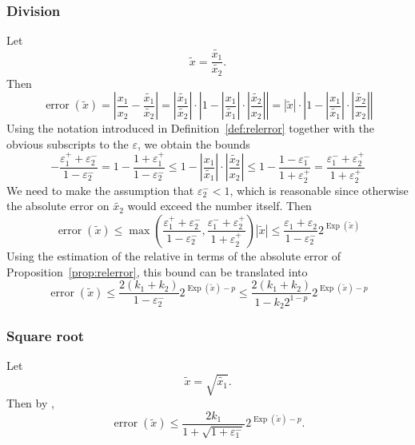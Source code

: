 \documentclass [11pt]{article}
\newcommand {\corr}[1]{{#1}}
\newcommand {\appro}[1]{\widetilde {#1}}
\DeclareMathOperator{\Exp}{\operatorname {Exp}}
\newcommand{\error}{\operatorname {error}}
\renewcommand {\epsilon}{\varepsilon}
\renewcommand {\leq}{\leqslant}
\begin{document}
\subsubsection {Division}
\label {sssec:proprealdiv}

Let
\[
\appro x = \frac {\appro {x_1}}{\appro {x_2}}.
\]
Then
\[
\error (\appro x) = \left|
\frac {\corr {x_1}}{\corr {x_2}} - \frac {\appro {x_1}}{\appro {x_2}} \right|
= \left| \frac {\appro {x_1}}{\appro {x_2}} \right|
\cdot \left|
1 - \left| \frac {\corr {x_1}}{\appro {x_1}} \right|
   \cdot \left| \frac {\appro {x_2}}{\corr {x_2}} \right|
\right|
= | \appro x |
\cdot \left|
1 - \left| \frac {\corr {x_1}}{\appro {x_1}} \right|
   \cdot \left| \frac {\appro {x_2}}{\corr {x_2}} \right|
\right|
\]
Using the notation introduced in Definition~\ref {def:relerror} together
with the obvious subscripts to the $\epsilon$, we obtain the bounds
\[
- \frac {\epsilon_1^+ + \epsilon_2^-}{1 - \epsilon_2^-}
=
1 - \frac {1 + \epsilon_1^+}{1 - \epsilon_2^-}
\leq
1 - \left| \frac {\corr {x_1}}{\appro {x_1}} \right|
   \cdot \left| \frac {\appro {x_2}}{\corr {x_2}} \right|
\leq
1 - \frac {1 - \epsilon_1^-}{1 + \epsilon_2^+}
=
\frac {\epsilon_1^- + \epsilon_2^+}{1 + \epsilon_2^+}
\]
We need to make the assumption that $\epsilon_2^- < 1$, which is reasonable
since otherwise the absolute error on $\appro {x_2}$ would exceed the number
itself. Then
\[
\error (\appro x)
\leq
\max \left(
   \frac {\epsilon_1^+ + \epsilon_2^-}{1 - \epsilon_2^-},
   \frac {\epsilon_1^- + \epsilon_2^+}{1 + \epsilon_2^+}
\right) |\appro x|
\leq
\frac {\epsilon_1 + \epsilon_2}{1 - \epsilon_2^-} 2^{\Exp (\appro x)}
\]
Using the estimation of the relative in terms of the absolute error of
Proposition~\ref {prop:relerror}, this bound can be translated into
\begin {equation}
\label {eq:proprealdiv}
\error (\appro x)
\leq
\frac {2 (k_1 + k_2)}{1 - \epsilon_2^-} 2^{\Exp (\appro x) - p}
\leq
\frac {2 (k_1 + k_2)}{1 - k_2 2^{1 - p}} 2^{\Exp (\appro x) - p}
\end {equation}


\subsubsection {Square root}
\label {sssec:proprealsqrt}

Let
\[
\appro x = \sqrt {\appro {x_1}}.
\]
Then by \cite[\S2.7]{MPFRAlgorithms},
\begin {equation}
\label {eq:proprealsqrt}
\error (\appro x)
\leq
\frac {2 k_1}{1 + \sqrt {1 + \epsilon_1^-}} 2^{\Exp (\appro x) - p}.
\end {equation}
\end{document}
